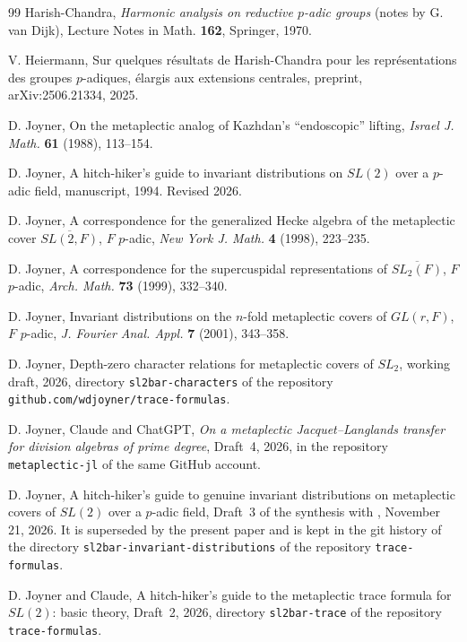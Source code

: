 \documentclass[12pt,letterpaper]{article}
\numberwithin{equation}{section}
\theoremstyle{definition}
\begin{document}
\begin{thebibliography}{99}
 Harish-Chandra, \emph{Harmonic analysis on reductive $p$-adic groups}
(notes by G. van Dijk), Lecture Notes in Math. \textbf{162}, Springer, 1970.

 V. Heiermann, Sur quelques r\'esultats de Harish-Chandra pour les
repr\'esentations des groupes $p$-adiques, \'elargis aux extensions centrales, preprint,
arXiv:2506.21334, 2025.

 D. Joyner, On the metaplectic analog of Kazhdan's ``endoscopic''
lifting, \emph{Israel J. Math.} \textbf{61} (1988), 113--154.

 D. Joyner, A hitch-hiker's guide to invariant distributions on
$SL(2)$ over a $p$-adic field, manuscript, 1994.  Revised 2026.

 D. Joyner, A correspondence for the generalized Hecke algebra of the
metaplectic cover $\overline{SL(2,F)}$, $F$ $p$-adic, \emph{New York J. Math.} \textbf{4}
(1998), 223--235.

 D. Joyner, A correspondence for the supercuspidal representations of
$\overline{SL_2(F)}$, $F$ $p$-adic, \emph{Arch. Math.} \textbf{73} (1999), 332--340.

 D. Joyner, Invariant distributions on the $n$-fold metaplectic covers
of $GL(r,F)$, $F$ $p$-adic, \emph{J. Fourier Anal. Appl.} \textbf{7} (2001), 343--358.

 D. Joyner, Depth-zero character relations for metaplectic covers of
$SL_2$, working draft, 2026, directory \texttt{sl2bar-characters} of the repository
\texttt{github.com/wdjoyner/trace-formulas}.

 D. Joyner, Claude and ChatGPT, \emph{On a metaplectic
Jacquet--Langlands transfer for division algebras of prime degree}, Draft~4, 2026, in the
repository \texttt{metaplectic-jl} of the same GitHub account.

 D. Joyner, A hitch-hiker's guide to genuine invariant distributions
on metaplectic covers of $SL(2)$ over a $p$-adic field, Draft~3 of the synthesis with
\cite{Jo01}, November 21, 2026.  It is superseded by the present paper and is kept in the
git history of the directory \texttt{sl2bar-invariant-distributions} of the repository
\texttt{trace-formulas}.

 D. Joyner and Claude, A hitch-hiker's guide to the metaplectic trace
formula for $SL(2)$: basic theory, Draft~2, 2026, directory \texttt{sl2bar-trace} of the
repository \texttt{trace-formulas}.


\end{thebibliography}
\end{document}
